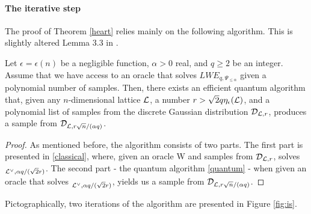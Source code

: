 \paragraph{The iterative step}
The proof of Theorem \ref{heart} relies mainly on the following algorithm. This is slightly altered Lemma 3.3 in \cite{regev}. 
\begin{lemma}\label{is}
	Let $\epsilon = \epsilon(n)$ be a negligible function, $\alpha > 0$ real, and $q \geq 2$ be an integer. Assume that we have access to an oracle that solves $LWE_{q,\Psi_{\leq \alpha}}$ given a polynomial number of samples. Then, there exists an efficient quantum algorithm that, given any $n$-dimensional lattice $\mathcal{L}$, a number $r > \sqrt{2}q \eta_{\epsilon}(\mathcal{L})$, and a polynomial list of samples from the discrete Gaussian distribution $\mathcal{D}_{\mathcal{L},r}$, produces a sample from $\mathcal{D}_{\mathcal{L},r\sqrt{n}/(\alpha q)}$.
\end{lemma}
\begin{proof}
	As mentioned before, the algorithm consists of two parts. The first part is presented in \ref{classical}, where, given an oracle W and samples from $\mathcal{D}_{\mathcal{L},r}$, solves $_{\mathcal{L}^{\vee}, \alpha q / (\sqrt{2} r)}$. The second part - the quantum algorithm \ref{quantum} - when given an oracle that solves $_{\mathcal{L}^{\vee}, \alpha q / (\sqrt{2} r)}$, yields us a sample from $\mathcal{D}_{\mathcal{L}, r\sqrt{n}/(\alpha q)}$.
\end{proof}
Pictographically, two iterations of the algorithm are presented in Figure \ref{fig:is}.
